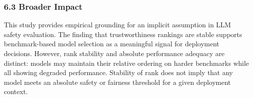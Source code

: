 \subsubsection{6.3 Broader Impact}

This study provides empirical grounding for an implicit assumption in LLM safety evaluation. The finding that trustworthiness rankings are stable supports benchmark-based model selection as a meaningful signal for deployment decisions. However, rank stability and absolute performance adequacy are distinct: models may maintain their relative ordering on harder benchmarks while all showing degraded performance. Stability of rank does not imply that any model meets an absolute safety or fairness threshold for a given deployment context.

